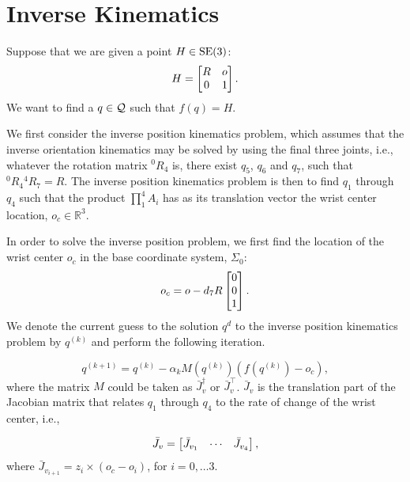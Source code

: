 \section{Inverse Kinematics}
\label{sec:inversekin}

Suppose that we are given a point $H \in \mathrm{SE}(3)$: 
\[ H = \begin{bmatrix}R & o \\ 0 & 1\end{bmatrix}. \]
We want to find a $q \in \mathcal{Q}$ such that $f(q) = H$.

We first consider the inverse position kinematics problem, 
which assumes that the inverse orientation kinematics may be 
solved by using the final three joints, i.e., whatever the 
rotation matrix $^0R_4$ is, there exist $q_5$, $q_6$ and $q_7$, 
such that ${}^0R_4 {}^4R_7 = R$. The inverse position kinematics 
problem is then to find $q_1$ through $q_4$ such that the product $\prod_1^4
A_i$ has as its translation vector the wrist center location, $o_c \in
\mathbb{R}^3$.

In order to solve the inverse position problem, we first find the location of
the wrist center $o_c$ in the base coordinate system,
$\Sigma_0$: \[ o_c = o - d_7 R \begin{bmatrix}0 \\ 0 \\ 1\end{bmatrix}. \]
%
We denote the current guess to the solution $q^d$ to the inverse position
kinematics problem by $q^{(k)}$ and perform the following iteration.

\begin{equation}
  q^{(k+1)} = q^{(k)} - \alpha_k M\left(q^{(k)}\right)\left(f\left(q^{(k)}\right) - o_c \right),
  \label{eq:ipk_iter}
\end{equation}
%
where the matrix $M$ could be taken as $\bar{J}_v^\dagger$ or $\bar{J}_v^\top$. 
$\bar{J}_v$ is the translation part of the Jacobian matrix that relates 
$q_1$ through $q_4$ to the rate of change of the wrist center, i.e., 

\[ \bar{J}_v = \begin{bmatrix}\bar{J}_{v_1} & \cdots & \bar{J}_{v_4}\end{bmatrix}, \]
where $\bar{J}_{v_{i+1}} = z_i \times (o_c - o_i)$, for $i = 0, \ldots 3$.
